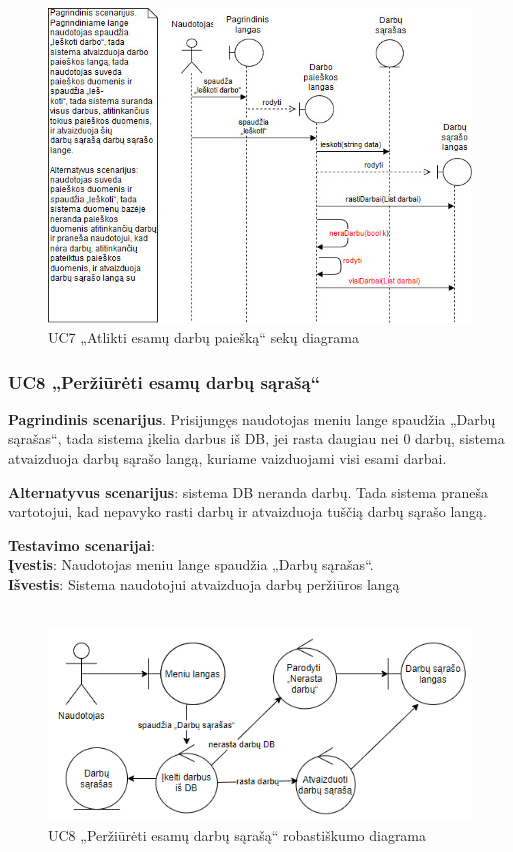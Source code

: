 \documentclass{VUMIFPSbakalaurinis}
\begin{document}
\begin{figure}[H]
	\centering
	\includegraphics[scale=0.6]{img/Sequence/7sequence}
	\caption{UC7 „Atlikti esamų darbų paiešką“ sekų diagrama}
	\label{img:uc7seq}
\end{figure}

\subsubsection{UC8 „Peržiūrėti esamų darbų sąrašą“}
\textbf{Pagrindinis scenarijus}. Prisijungęs naudotojas meniu lange spaudžia „Darbų sąrašas“, tada sistema įkelia darbus iš DB, jei rasta daugiau nei 0 darbų, sistema atvaizduoja darbų sąrašo langą, kuriame vaizduojami visi esami darbai.
\par \textbf{Alternatyvus scenarijus}: sistema DB neranda darbų. Tada sistema praneša vartotojui, kad nepavyko rasti darbų ir atvaizduoja tuščią darbų sąrašo langą.
\par \textbf{Testavimo scenarijai}:\\
\textbf{Įvestis}: Naudotojas meniu lange spaudžia „Darbų sąrašas“. \\
\textbf{Išvestis}: Sistema naudotojui atvaizduoja darbų peržiūros langą \\ \\

\begin{figure}[H]
	\centering
	\includegraphics[scale=0.6]{img/Robustness/UC8}
	\caption{UC8 „Peržiūrėti esamų darbų sąrašą“ robastiškumo diagrama}
	\label{img:uc8rob}
\end{figure}
\end{document}

